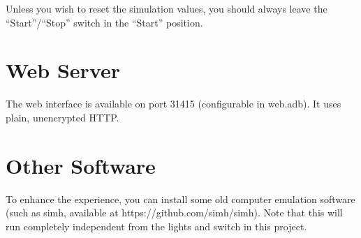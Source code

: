 \documentclass[10pt, openany]{book}
\newcommand{\switch}[2]{``#1''/``#2''}
\newcommand{\position}[1]{``#1''}
\begin{document}
Unless you wish to reset the simulation values, you should always leave the \switch{Start}{Stop} switch in the \position{Start} position.

\section{Web Server}
The web interface is available on port 31415 (configurable in web.adb).  It uses plain, unencrypted HTTP.

\section{Other Software}
To enhance the experience, you can install some old computer emulation software (such as simh, available at https://github.com/simh/simh).  Note that this will run completely independent from the lights and switch in this project.
\end{document}
